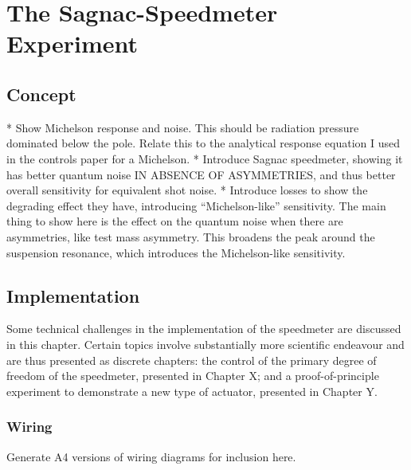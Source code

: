 \chapter{The Sagnac-Speedmeter Experiment}
\label{c:speedmeter-intro}

\section{Concept}
* Show Michelson response and noise. This should be radiation pressure dominated below the pole. Relate this to the analytical response equation I used in the controls paper for a Michelson.
* Introduce Sagnac speedmeter, showing it has better quantum noise IN ABSENCE OF ASYMMETRIES, and thus better overall sensitivity for equivalent shot noise.
* Introduce losses to show the degrading effect they have, introducing ``Michelson-like'' sensitivity. The main thing to show here is the effect on the quantum noise when there are asymmetries, like test mass asymmetry. This broadens the peak around the suspension resonance, which introduces the Michelson-like sensitivity.

\section{Implementation}

Some technical challenges in the implementation of the speedmeter are discussed in this chapter. Certain topics involve substantially more scientific endeavour and are thus presented as discrete chapters: the control of the primary degree of freedom of the speedmeter, presented in Chapter X; and a proof-of-principle experiment to demonstrate a new type of actuator, presented in Chapter Y.

\subsection{Wiring}

Generate A4 versions of wiring diagrams for inclusion here.